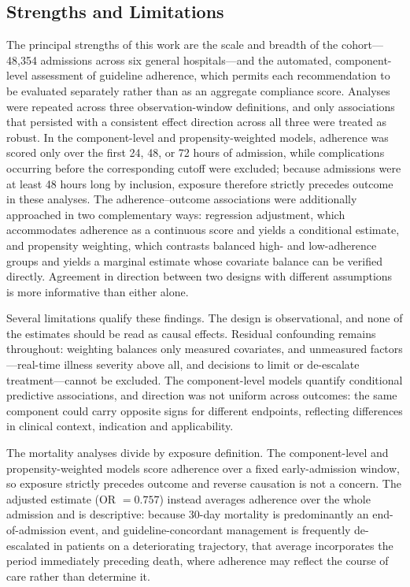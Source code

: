 \subsection{Strengths and Limitations}

The principal strengths of this work are the scale and breadth of the
cohort---48,354 admissions across six general hospitals---and the automated,
component-level assessment of guideline adherence, which permits each
recommendation to be evaluated separately rather than as an aggregate
compliance score. Analyses were repeated across three observation-window
definitions, and only associations that persisted with a consistent effect
direction across all three were treated as robust. In the component-level
and propensity-weighted models, adherence was scored only over the first
24, 48, or 72 hours of admission, while complications occurring before the
corresponding cutoff were excluded; because admissions were at least 48
hours long by inclusion, exposure therefore strictly precedes outcome in
these analyses. The adherence--outcome associations were additionally
approached in two complementary ways: regression adjustment, which
accommodates adherence as a continuous score and yields a conditional
estimate, and propensity weighting, which contrasts balanced high- and
low-adherence groups and yields a marginal estimate whose covariate balance
can be verified directly. Agreement in direction between two designs with
different assumptions is more informative than either alone.

Several limitations qualify these findings. The design is observational, and
none of the estimates should be read as causal effects. Residual confounding
remains throughout: weighting balances only measured covariates, and
unmeasured factors---real-time illness severity above all, and decisions to
limit or de-escalate treatment---cannot be excluded. The component-level
models quantify conditional predictive associations, and direction was not
uniform across outcomes: the same component could carry opposite signs for
different endpoints, reflecting differences in clinical context, indication
and applicability.

The mortality analyses divide by exposure definition. The component-level
and propensity-weighted models score adherence over a fixed early-admission
window, so exposure strictly precedes outcome and reverse causation is not a
concern. The adjusted estimate (OR $=0.757$) instead averages adherence over
the whole admission and is descriptive: because 30-day mortality is
predominantly an end-of-admission event, and guideline-concordant management
is frequently de-escalated in patients on a deteriorating trajectory, that
average incorporates the period immediately preceding death, where adherence
may reflect the course of care rather than determine it.

